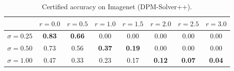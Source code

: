 \vspace{0.5cm} %
\begin{table*}[h]
	\centering
	\begin{tabular}{c|ccccccc}
		& $r = 0.0$& $r = 0.5$& $r = 1.0$& $r = 1.5$& $r = 2.0$& $r = 2.5$& $r = 3.0$\\
		\midrule
		$\sigma = 0.25$ & \textbf{0.83} & \textbf{0.66} & 0.00 & 0.00 & 0.00 & 0.00 & 0.00\\
		$\sigma = 0.50$ & 0.73 & 0.56 & \textbf{0.37} & \textbf{0.19} & 0.00 & 0.00 & 0.00\\
		$\sigma = 1.00$ & 0.47 & 0.33 & 0.23 & 0.17 & \textbf{0.12} & \textbf{0.07} & \textbf{0.04}\\
		
	\end{tabular}
	\captionsetup{labelsep=colon} %
	\caption{Certified accuracy on Imagenet (DPM-Solver++).}
	\vspace{0.5cm} %
	
\end{table*}
